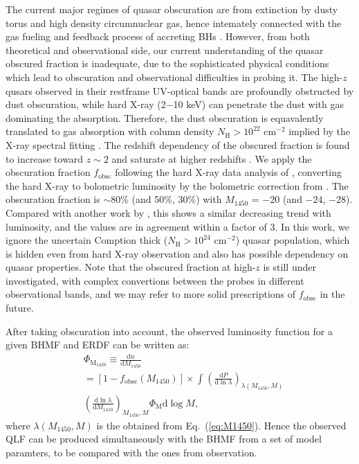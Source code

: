 \documentclass[nolinenumbers,preprint2,tighten]{aastex631}
\newcommand{\fobsc}{f_\mathrm{obsc}}
\newcommand{\Muv}{M_{1450}}
\newcommand{\D}{\mathrm{d}}
\begin{document}
\begin{CJK*}{UTF8}{gbsn}
The current major regimes of quasar obscuration are from extinction by dusty torus and high density circumnuclear gas, 
hence intemately connected with the gas fueling and feedback process of accreting BHs \citep[see][for a review]{2018ARA&A..56..625H}.
However, from both theoretical and observational side, our current understanding of the quasar obscured fraction is inadequate, 
due to the sophisticated physical conditions which lead to obscuration and observational difficulties in probing it.
The high-$z$ qusars observed in their restframe UV-optical bands are profoundly obstructed by dust obscuration, 
while hard X-ray (2$-$10 keV) can penetrate the dust with gas dominating the absorption. 
Therefore, the dust obscuration is equavalently translated to gas absorption with column density $N_\mathrm{H}>10^{22}$ cm$^{-2}$ 
implied by the X-ray spectral fitting \citep[e.g.,][]{2003ApJ...598..886U,2007A&A...463...79G,2008A&A...490..905H}.
The redshift dependency of the obscured fraction is found to increase toward $z\sim 2$ and saturate at higher redshifts 
\citep{2008A&A...490..905H,2014ApJ...786..104U,2018MNRAS.473.2378V}.
We apply the obscuration fraction $\fobsc$ following the hard X-ray data analysis of \citet{2014ApJ...786..104U}, 
converting the hard X-ray to bolometric luminosity by the bolometric correction from \citet{2020A&A...636A..73D}.
The obscuration fraction is $\sim80\%$ (and 50\%, 30\%) with $\Muv$ = $-20$ (and $-24$, $-28$). 
Compared with another work by  \citet{2014MNRAS.437.3550M}, this shows a similar decreasing trend with luminosity, 
and the values are in agreement within a factor of 3.
In this work, we ignore the uncertain Comption thick ($N_\mathrm{H}>10^{24}$ cm$^{-2}$) quasar population, which is hidden even from hard X-ray observation 
and also has possible dependency on quasar properties.
Note that the obscured fraction at high-$z$ is still under investigated, 
with complex convertions between the probes in different observational bands,
and we may refer to more solid prescriptions of $\fobsc$ in the future.


After taking obscuration into account, the observed luminosity function for a given BHMF and ERDF can be written as:
\begin{align}
\label{eq:dn_dM1450}
& \Phi_\mathrm{\Muv} \equiv \frac{\D n}{\D \Muv} \nonumber \\
& = \left[1 -\fobsc\left(\Muv\right) \right] \times %
\int_{}^{} \left(\frac{\D P}{\D \ln \lambda}\right)_{\lambda(\Muv, M)}  \nonumber \\
& \left(\frac{\D \ln \lambda}{\D \Muv} \right)_{\Muv, M} \Phi_\mathrm{M} \D \log M,
\end{align}
where $\lambda\left(\Muv,M\right)$ is the obtained from Eq.~(\ref{eq:M1450}).
%
Hence the observed QLF can be produced simultaneously with the BHMF from a set of model paramters, 
to be compared with the ones from observation.


\end{CJK*}
\end{document}
